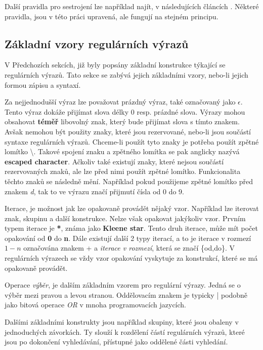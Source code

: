 Další pravidla pro sestrojení lze například najít, v následujících článcích \cite{Thompson1,Thompson2}.
Některé pravidla, jsou v této práci upravená, ale fungují na stejném principu.

\subsection*{Základní vzory regulárních výrazů}
V Předchozích sekcích, již byly popsány základní konstrukce týkající se regulárních výrazů.
Tato sekce se zabývá jejich základními vzory, nebo-li jejich formou zápisu a syntaxí.

Za nejjednodušší výraz lze považovat prázdný výraz, také označovaný jako $\epsilon$. 
Tento výraz dokáže přijímat slova délky 0 resp. prázdné slova.
Výrazy mohou obsahovat \textbf{téměř} libovolný znak, který bude přijímat slova s tímto znakem. 
Avšak nemohou být použity znaky, které jsou rezervované, nebo-li jsou součástí syntaxe regulárních výrazů.
Chceme-li použít tyto znaky je potřeba použít zpětné lomítko \textbackslash. 
Takové spojení znaku a zpětného lomítka se pak anglicky nazývá \textbf{escaped character}.
Ačkoliv také existují znaky, které nejsou součástí rezervovaných znaků, ale lze před nimi použít zpětné lomítko.
Funkcionalita těchto znaků se následně mění. 
Například pokud použijeme zpětné lomítko před znakem \textit{d}, tak to ve výrazu značí přijmutí čísla od 0 do 9.

Iterace, je možnost jak lze opakovaně provádět nějaký vzor.
Například lze iterovat znak, skupinu a další konstrukce. 
Nelze však opakovat jakýkoliv vzor.
Prvním typem iterace je \textbf{*}, známa jako \textbf{Kleene star}.
Tento druh iterace, může mít počet opakování od \textbf{0} do \textbf{n}. 
Dále existují další 2 typy iterací, a to je iterace v rozmezí $1-n$ označována znakem + a \textit{iterace v rozmezí}, která se značí \{od,do\}.
V regulárních výrazech se vždy vzor opakování vyskytuje za konstrukcí, které se má opakovaně provádět.

Operace \textit{výběr}, je dalším základním vzorem pro regulární výrazy. 
Jedná se o výběr mezi pravou a levou stranou. 
Oddělovacím znakem je typicky | podobně jako bitová operace \textit{OR} v mnoha programovacích jazycích.

Dalšími základními konstrukty jsou například skupiny, které jsou obaleny v jednoduchých závorkách.
Ty slouží k rozdělení částí regulárních výrazů, které jsou po dokončení vyhledávání, přístupné jako oddělené části vyhledání.

